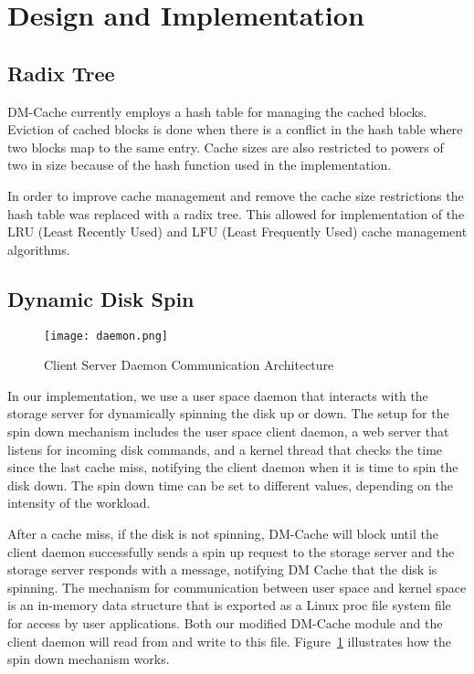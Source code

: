 \section{Design and Implementation}
\label{sec:implementation}

\subsection{Radix Tree}

DM-Cache currently employs a hash table for managing the cached blocks. Eviction
of cached blocks is done when there is a conflict in the hash table where two
blocks map to the same entry. Cache sizes are also restricted to powers of two
in size because of the hash function used in the implementation.

In order to improve cache management and remove the cache size restrictions the
hash table was replaced with a radix tree. This allowed for implementation of
the LRU (Least Recently Used) and LFU (Least Frequently Used) cache management
algorithms.

\subsection{Dynamic Disk Spin}

\begin{figure}[t]
  \caption{Client Server Daemon Communication Architecture}
  \centering \texttt{[image: daemon.png]}
  \label{fig:daemon}
\end{figure}

In our implementation, we use a user space daemon that interacts with the
storage server for dynamically spinning the disk up or down. The setup for the
spin down mechanism includes the user space client daemon, a web server that
listens for incoming disk commands, and a kernel thread that checks the time
since the last cache miss, notifying the client daemon when it is time to spin
the disk down. The spin down time can be set to different values, depending on
the intensity of the workload.

After a cache miss, if the disk is not spinning, DM-Cache will block until the
client daemon successfully sends a spin up request to the storage server and the
storage server responds with a message, notifying DM Cache that the disk is
spinning. The mechanism for communication between user space and kernel space is
an in-memory data structure that is exported as a Linux proc file system file
for access by user applications. Both our modified DM-Cache module and the
client daemon will read from and write to this file. Figure~\ref{fig:daemon}
illustrates how the spin down mechanism works.
